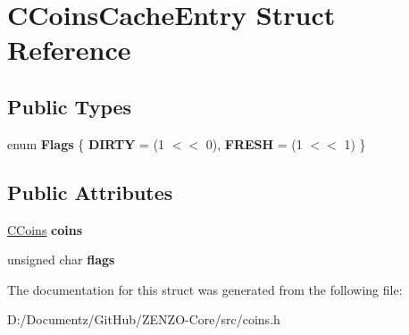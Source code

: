 \hypertarget{struct_c_coins_cache_entry}{}\section{C\+Coins\+Cache\+Entry Struct Reference}
\label{struct_c_coins_cache_entry}
\subsection*{Public Types}
\begin{DoxyCompactItemize}
\item 
\mbox{\label{struct_c_coins_cache_entry_a1d5ac74da0f6ff5ab056e47ce79753c7}} 
enum {\bfseries Flags} \{ {\bfseries D\+I\+R\+TY} = (1 $<$$<$ 0), 
{\bfseries F\+R\+E\+SH} = (1 $<$$<$ 1)
 \}
\end{DoxyCompactItemize}
\subsection*{Public Attributes}
\begin{DoxyCompactItemize}
\item 
\mbox{\label{struct_c_coins_cache_entry_a343585f1fcb810f9c21fc25ae42a1eba}} 
\mbox{\hyperlink{class_c_coins}{C\+Coins}} {\bfseries coins}
\item 
\mbox{\label{struct_c_coins_cache_entry_a05225c349f51777385e3a1c9b0eeaaed}} 
unsigned char {\bfseries flags}
\end{DoxyCompactItemize}


The documentation for this struct was generated from the following file\+:\begin{DoxyCompactItemize}
\item 
D\+:/\+Documentz/\+Git\+Hub/\+Z\+E\+N\+Z\+O-\/\+Core/src/coins.\+h\end{DoxyCompactItemize}

